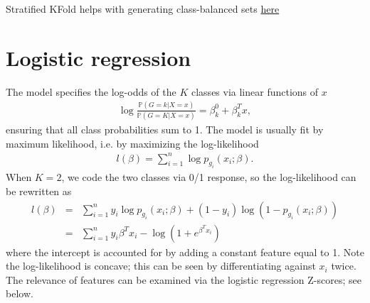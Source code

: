 \documentclass[]{article}
\begin{document}
\noindent Stratified KFold helps with generating class-balanced sets \href{https://scikit-learn.org/stable/modules/generated/sklearn.model_selection.StratifiedKFold.html#sklearn.model_selection.StratifiedKFold}{here}

\section{Logistic regression}

The model specifies the log-odds of the $K$ classes via linear functions of $x$
\begin{eqnarray}
\log \frac{\mathbb{P}(G=k|X=x)}{\mathbb{P}(G=K|X=x)}=\beta_k^0+\beta_k^Tx,
\end{eqnarray}
ensuring that all class probabilities sum to 1. The model is usually fit by maximum likelihood, i.e. by maximizing the log-likelihood
\begin{eqnarray}
l(\beta)=\sum_{i=1}^n \log p_{g_i}(x_i; \beta).
\end{eqnarray}
When $K=2$, we code the two classes via 0/1 response, so the log-likelihood can be rewritten as
\begin{eqnarray}
l(\beta)&=&\sum_{i=1}^n y_i\log p_{g_i}(x_i; \beta)+(1-y_i)\log\left( 1-p_{g_i}(x_i; \beta)\right)\\
&=&\sum_{i=1}^n y_i\beta^T x_i-\log\left(1+e^{\beta^T x_i}\right)
\end{eqnarray}
where the intercept is accounted for by adding a constant feature equal to 1. Note the log-likelihood is concave; this can be seen by differentiating against $x_i$ twice. \\

\noindent The relevance of features can be examined via the logistic regression Z-scores; see below.
\end{document}
